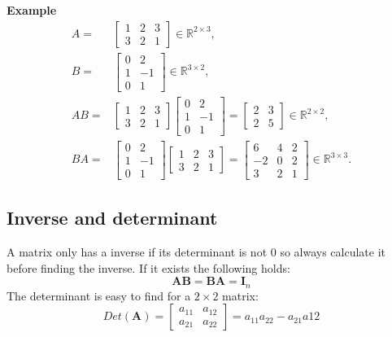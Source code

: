 \textbf{Example}
\begin{align*}
A =& \begin{bmatrix}
1 & 2 & 3 \\
3 & 2 & 1
\end{bmatrix} \in \mathbb{R}^{2 \times 3},\\
  B =& \begin{bmatrix}
0 & 2 \\
1 & -1 \\
0 & 1
\end{bmatrix} \in \mathbb{R}^{3 \times 2},\\
  AB =& \begin{bmatrix}
1 & 2 & 3 \\
3 & 2 & 1
\end{bmatrix}
\begin{bmatrix}
0 & 2 \\
1 & -1 \\
0 & 1
\end{bmatrix}
= \begin{bmatrix}
2 & 3 \\
2 & 5
\end{bmatrix} \in \mathbb{R}^{2 \times 2},\\
BA =& \begin{bmatrix}
0 & 2 \\
1 & -1 \\
0 & 1
\end{bmatrix}
\begin{bmatrix}
1 & 2 & 3 \\
3 & 2 & 1
\end{bmatrix}
= \begin{bmatrix}
6 & 4 & 2 \\
-2 & 0 & 2 \\
3 & 2 & 1
\end{bmatrix} \in \mathbb{R}^{3 \times 3}.
\end{align*}

\subsection{Inverse and determinant}
A matrix only has a inverse if its determinant is not 0 so always calculate it before finding the inverse. If it exists the following holds:
$$
\mathbf{AB} = \mathbf{BA} = \mathbf{I}_n
$$
\noindent
The determinant is easy to find for a $2 \times 2$ matrix:
$$
Det(\mathbf{A}) =
\begin{bmatrix}
  a_{11} & a_{12}\\
  a_{21} & a_{22}
\end{bmatrix}
= a_{11}a_{22} - a_{21}a{12}
$$

